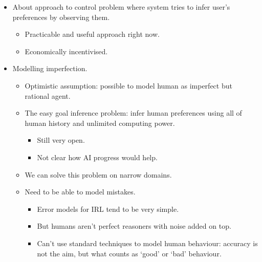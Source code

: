 \begin{itemize}
    \item About approach to control problem where system tries to infer user's preferences by observing them.
    \begin{itemize}
        \item Practicable and useful approach right now.
        \item Economically incentivised.
    \end{itemize}
    \item Modelling imperfection.
    \begin{itemize}
        \item Optimistic assumption: possible to model human as imperfect but rational agent.
        \item The easy goal inference problem: infer human preferences using all of human history and unlimited computing power.
        \begin{itemize}
            \item Still very open.
            \item Not clear how AI progress would help.
        \end{itemize}
        \item We can solve this problem on narrow domains.
        \item Need to be able to model mistakes.
        \begin{itemize}
            \item Error models for IRL tend to be very simple.
            \item But humans aren't perfect reasoners with noise added on top.
            \item Can't use standard techniques to model human behaviour: accuracy is not the aim, but what counts as `good' or `bad' behaviour.
        \end{itemize}
    \end{itemize}
\end{itemize}